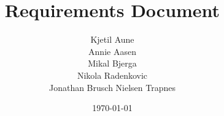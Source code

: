 \newcommand{\mytitle}{Requirements Document}
\newcommand{\mygroupnumber}{A6\\Android}
\newcommand{\myauthor}{Kjetil Aune\\Annie Aasen\\Mikal Bjerga\\Nikola Radenkovic\\Jonathan Brusch Nielsen Trapnes}

\title{\mytitle}
\author{\myauthor}
\date{\today}
